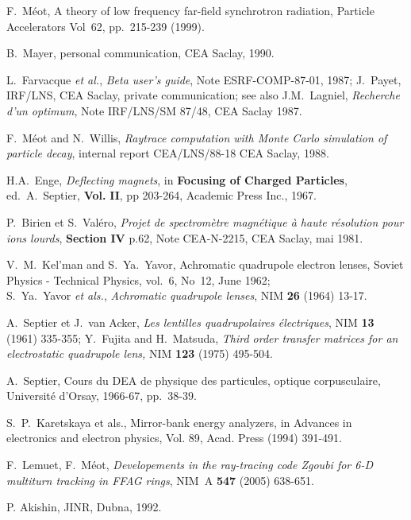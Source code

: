 \begin{thebibliography}{99}
 F.~M\'eot, A theory of low frequency far-field synchrotron radiation, 
 Particle Accelerators Vol~62, pp.~215-239  (1999). 

 B.~Mayer, personal communication,
CEA Saclay, 1990. 

 L.~Farvacque \textsl{et al.}, \textsl{Beta user's guide}, Note 
ESRF-COMP-87-01, 1987; 
J.~Payet, IRF/LNS, CEA Saclay, private communication; see also J.M.~Lagniel, 
\textsl{Recherche d'un optimum}, Note IRF/LNS/SM 87/48, CEA Saclay 1987.


 F.~M\'eot and N.~Willis, \textsl{Raytrace computation with 
Monte Carlo simulation of particle decay}, internal report CEA/LNS/88-18 
CEA Saclay, 1988. 

 H.A.~Enge, \textsl{Deflecting magnets}, in \textbf{Focusing of 
Charged Particles}, ed.~A.~Septier, \textbf{Vol.}  \textbf{II}, pp 203-264, Academic
Press Inc., 1967.

 P.~Birien et S.~Val\'ero, \textsl{Projet de spectrom\`etre 
magn\'etique \`a haute r\'esolution pour ions lourds}, \textbf{Section IV} 
p.62, Note CEA-N-2215, CEA Saclay, mai 1981.

 V.~M.~Kel'man and S.~Ya.~Yavor, Achromatic
quadrupole electron lenses, Soviet Physics - Technical Physics, vol.~6, No~12, June 1962; \\
S.~Ya.~Yavor \textsl{et als.}, \textsl{Achromatic quadrupole lenses}, NIM \textbf{26} (1964) 13-17. 

 A.~Septier et J.~van Acker, \textsl{Les lentilles quadrupolaires 
\'electriques}, NIM \textbf{13} (1961) 335-355; Y.~Fujita and H.~Matsuda, 
\textsl{Third order transfer matrices for an electrostatic quadrupole lens,} 
NIM \textbf{123} (1975) 495-504. 

 A.~Septier, Cours du DEA de physique des
particules, optique corpusculaire, Universit\'e d'Orsay, 1966-67, pp.~38-39.  

 S.~P.~Karetskaya et als., Mirror-bank energy analyzers, in Advances in 
electronics and electron physics, Vol. 89, Acad. Press (1994) 391-491. 

 F.~Lemuet, F.~M\'eot, \textsl{Developements in the ray-tracing code Zgoubi for 
6-D multiturn tracking in FFAG rings}, NIM~A \textbf{547} (2005) 638-651. 

 P. Akishin, JINR, Dubna, 1992.



\end{thebibliography}
